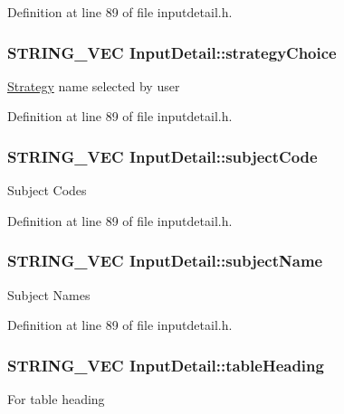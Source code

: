 Definition at line 89 of file inputdetail.\-h.

\hypertarget{classInputDetail_acbdbb6ecb850dec574b5878764c56c88}{
\subsubsection[{strategy\-Choice}]{\setlength{\rightskip}{0pt plus 5cm}S\-T\-R\-I\-N\-G\-\_\-\-V\-E\-C Input\-Detail\-::strategy\-Choice\hspace{0.3cm}{\ttfamily [protected]}}}\label{classInputDetail_acbdbb6ecb850dec574b5878764c56c88}
\hyperlink{classStrategy}{Strategy} name selected by user 

Definition at line 89 of file inputdetail.\-h.

\hypertarget{classInputDetail_ab391f03f242defb952e24a584eefdb35}{
\subsubsection[{subject\-Code}]{\setlength{\rightskip}{0pt plus 5cm}S\-T\-R\-I\-N\-G\-\_\-\-V\-E\-C Input\-Detail\-::subject\-Code\hspace{0.3cm}{\ttfamily [protected]}}}\label{classInputDetail_ab391f03f242defb952e24a584eefdb35}
Subject Codes 

Definition at line 89 of file inputdetail.\-h.

\hypertarget{classInputDetail_a860676e6e8b258a4cf6265e693194e93}{
\subsubsection[{subject\-Name}]{\setlength{\rightskip}{0pt plus 5cm}S\-T\-R\-I\-N\-G\-\_\-\-V\-E\-C Input\-Detail\-::subject\-Name\hspace{0.3cm}{\ttfamily [protected]}}}\label{classInputDetail_a860676e6e8b258a4cf6265e693194e93}
Subject Names 

Definition at line 89 of file inputdetail.\-h.

\hypertarget{classInputDetail_a9adc25a6c332855ee0c2dbd5fd71ca86}{
\subsubsection[{table\-Heading}]{\setlength{\rightskip}{0pt plus 5cm}S\-T\-R\-I\-N\-G\-\_\-\-V\-E\-C Input\-Detail\-::table\-Heading\hspace{0.3cm}{\ttfamily [protected]}}}\label{classInputDetail_a9adc25a6c332855ee0c2dbd5fd71ca86}
For table heading 

